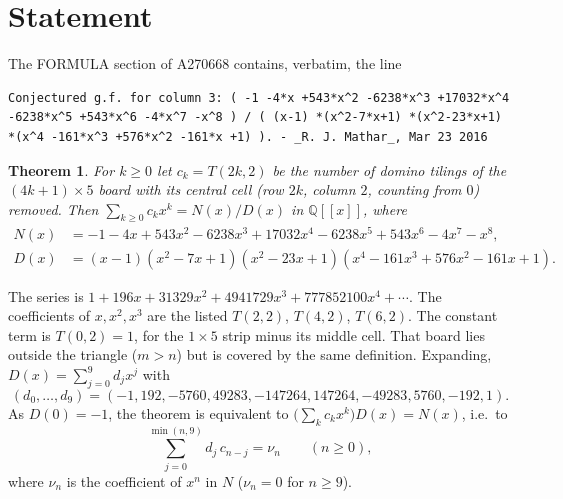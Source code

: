 \documentclass[11pt]{amsart}
\theoremstyle{plain}
\newtheorem{theorem}{Theorem}
\theoremstyle{definition}
\newcommand{\Q}{\mathbb{Q}}
\begin{document}
\section{Statement}\label{sec:statement}

The FORMULA section of A270668 \cite{A270668} contains, verbatim, the line
\begin{lstlisting}[language={},frame=none,basicstyle=\ttfamily\footnotesize]
Conjectured g.f. for column 3: ( -1 -4*x +543*x^2 -6238*x^3 +17032*x^4 -6238*x^5 +543*x^6 -4*x^7 -x^8 ) / ( (x-1) *(x^2-7*x+1) *(x^2-23*x+1) *(x^4 -161*x^3 +576*x^2 -161*x +1) ). - _R. J. Mathar_, Mar 23 2016
\end{lstlisting}

\begin{theorem}\label{thm:main}
For $k\ge0$ let $c_k=T(2k,2)$ be the number of domino tilings of the $(4k+1)\times5$ board with its central cell (row $2k$, column $2$, counting from $0$) removed. Then $\sum_{k\ge0}c_kx^k=N(x)/D(x)$ in $\Q[[x]]$, where
\begin{align*}
  N(x)&=-1-4x+543x^2-6238x^3+17032x^4-6238x^5+543x^6-4x^7-x^8,\\
  D(x)&=(x-1)(x^2-7x+1)(x^2-23x+1)(x^4-161x^3+576x^2-161x+1).
\end{align*}
\end{theorem}

The series is $1+196x+31329x^2+4941729x^3+777852100x^4+\cdots$. The coefficients of $x,x^2,x^3$ are the listed $T(2,2)$, $T(4,2)$, $T(6,2)$. The constant term is $T(0,2)=1$, for the $1\times5$ strip minus its middle cell. That board lies outside the triangle ($m>n$) but is covered by the same definition. Expanding, $D(x)=\sum_{j=0}^{9}d_jx^j$ with
\begin{equation}\label{eq:den}
  (d_0,\dots,d_9)=(-1,192,-5760,49283,-147264,147264,-49283,5760,-192,1).
\end{equation}
As $D(0)=-1$, the theorem is equivalent to $\bigl(\sum_kc_kx^k\bigr)D(x)=N(x)$, i.e.\ to
\begin{equation}\label{eq:coeff}
  \textstyle\sum_{j=0}^{\min(n,9)}d_j\,c_{n-j}=\nu_n\qquad(n\ge0),
\end{equation}
where $\nu_n$ is the coefficient of $x^n$ in $N$ ($\nu_n=0$ for $n\ge9$).
\end{document}
